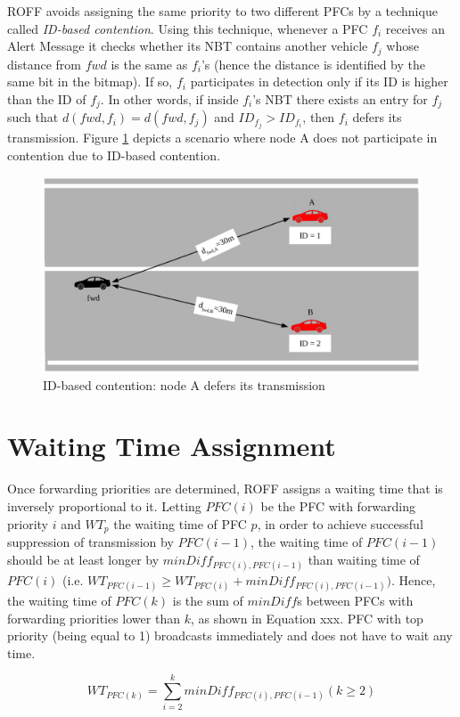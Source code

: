 			
			ROFF avoids assigning the same priority to two different PFCs by a technique called \textit{ID-based contention}. Using this technique, whenever a PFC $f_i$ receives an Alert Message it checks whether its NBT contains another vehicle $f_j$ whose distance from $fwd$ is the same as $f_i$'s (hence the distance is identified by the same bit in the bitmap). If so, $f_i$ participates in detection only if its ID is higher than the ID of $f_j$. In other words, if inside $f_i$'s NBT there exists an entry for $f_j$ such that $d(fwd, f_i) = d(fwd, f_j)$ and $ID_{f_j} > ID_{f_i}$, then $f_i$ defers its transmission. Figure \ref{fig:idBasedContention} depicts a scenario where node A does not participate in contention due to ID-based contention.
	
			\begin{figure}[H]
				\centering
				\includegraphics[width=\textwidth]{immagini/idBasedContention}
				\caption{ID-based contention: node A defers its transmission}
				\label{fig:idBasedContention}
			\end{figure}
		
		\section{Waiting Time Assignment}
			Once forwarding priorities are determined, ROFF assigns a waiting time that is inversely proportional to it. Letting $PFC(i)$ be the PFC with forwarding priority $i$ and $WT_p$ the waiting time of PFC $p$, in order to achieve successful suppression of transmission by $PFC(i-1)$, the waiting time of $PFC(i-1)$ should be at least longer by $minDiff_{PFC(i), PFC(i-1)}$ than waiting time of $PFC(i)$ (i.e. $WT_{PFC(i-1)} \geq WT_{PFC(i)} + minDiff_{PFC(i), PFC(i-1)})$. Hence, the waiting time of $PFC(k)$ is the sum of $minDiff$s between PFCs with forwarding priorities lower than $k$, as shown in Equation xxx. PFC with top priority (being equal to 1) broadcasts immediately and does not have to wait any time.
			
			$$WT_{PFC(k)} = \sum_{i=2}^{k} minDiff_{PFC(i),PFC(i-1)} (k \geq 2)$$
		
		
		
		
	